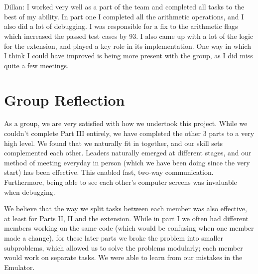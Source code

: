 \documentclass[11pt]{article}
\begin{document}
\\
\\
Dillan:
I worked very well as a part of the team and completed all tasks to the best of my ability. In part one I completed all the arithmetic operations, and I also did a lot of debugging. I was responsible for a fix to the arithmetic flags which increased the passed test cases by 93. I also came up with a lot of the logic for the extension, and played a key role in its implementation. One way in which I think I could have improved is being more present with the group, as I did miss quite a few meetings.


\section{Group Reflection}
As a group, we are very satisfied with how we undertook this project. While we couldn’t complete Part III entirely,  we have completed the other 3 parts to a very high level. We found that we naturally fit in together, and our skill sets complemented each other. Leaders naturally emerged at different stages, and our method of meeting everyday in person (which we have been doing since the very start) has been effective. This enabled fast, two-way communication. Furthermore, being able to see each other’s computer screens was invaluable when debugging. 

We believe that the way we split tasks between each member was also effective, at least for Parts II, II and the extension. While in part I we often had different members working on the same code (which would be confusing when one member made a change), for these later parts we broke the problem into smaller subproblems, which allowed us to solve the problems modularly; each member would work on separate tasks. We were able to learn from our mistakes in the Emulator.
\end{document}
